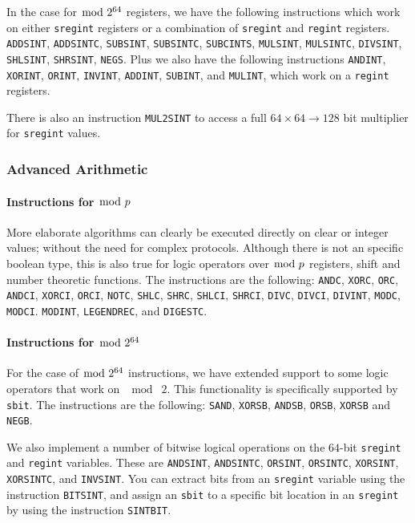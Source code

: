 In  the case for $\bmod \; 2^{64}$ registers, we have the following instructions
which work on either \verb|sregint| registers or a combination
of \verb|sregint| and \verb|regint| registers.
	\verb+ADDSINT+,
	\verb+ADDSINTC+,
	\verb+SUBSINT+,
	\verb+SUBSINTC+,
	\verb+SUBCINTS+,
	\verb+MULSINT+,
	\verb+MULSINTC+,
	\verb+DIVSINT+,
	\verb+SHLSINT+,
	\verb+SHRSINT+,
	\verb+NEGS+.
Plus we also have the following instructions
  \verb+ANDINT+,
  \verb+XORINT+,
  \verb+ORINT+,
  \verb+INVINT+,
  \verb+ADDINT+,
  \verb+SUBINT+, and
  \verb+MULINT+,
which work on a \verb|regint| registers.

There is also an instruction \verb+MUL2SINT+ to access a
full $64 \times 64 \longrightarrow 128$ bit multiplier
for \verb|sregint| values.

\subsubsection{Advanced Arithmetic}
\paragraph{Instructions for $\bmod \; p$}
More elaborate algorithms can clearly be executed directly on
clear or integer values; without the need for complex
protocols. Although there is not an specific boolean type, this is also true for logic operators over $\bmod \; p$ registers, shift and number
theoretic functions. The instructions are the following:
    \verb+ANDC+,
    \verb+XORC+,
    \verb+ORC+,
    \verb+ANDCI+,
    \verb+XORCI+,
    \verb+ORCI+,
    \verb+NOTC+,
    \verb+SHLC+,
    \verb+SHRC+,
    \verb+SHLCI+,
    \verb+SHRCI+,
    \verb+DIVC+,
    \verb+DIVCI+,
    \verb+DIVINT+,
    \verb+MODC+,
    \verb+MODCI+.
    \verb+MODINT+,
    \verb+LEGENDREC+,
and
    \verb+DIGESTC+.
\paragraph{Instructions for $\bmod \; 2^{64}$}
For the case of $\bmod \; 2^{64}$ instructions, we have extended support to some logic operators that work on $\mod \; 2$.
This functionality is specifically supported by \verb+sbit+.
The instructions are the following:
\verb+SAND+,
\verb+XORSB+,
\verb+ANDSB+,
\verb+ORSB+,
\verb+XORSB+ and
\verb+NEGB+.

We also implement a number of bitwise logical operations on the $64$-bit
\verb|sregint| and \verb|regint| variables. These are
\verb+ANDSINT+,
\verb+ANDSINTC+,
\verb+ORSINT+,
\verb+ORSINTC+,
\verb+XORSINT+,
\verb+XORSINTC+,
and
\verb+INVSINT+.
You can extract bits from an \verb|sregint| variable using the instruction
\verb+BITSINT+, and assign an \verb|sbit| to a specific bit location in
an \verb|sregint| by using the instruction \verb+SINTBIT+.

